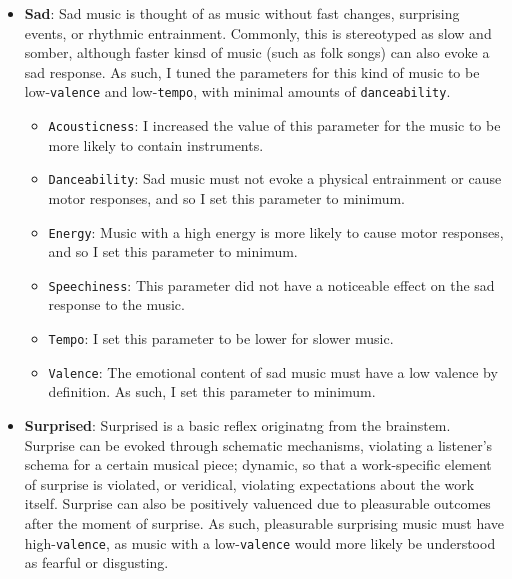 \documentclass{article}
\renewcommand{\_}[1]{\underline{ #1 }}
\theoremstyle{definition}
\begin{document}
\begin{itemize}
    \item \textbf{Sad}: Sad music is thought of as music without fast changes, surprising events, or rhythmic entrainment. Commonly, this is stereotyped as slow and somber, although faster kinsd of music (such as folk songs) can also evoke a sad response. As such, I tuned the parameters for this kind of music to be low-\texttt{valence} and low-\texttt{tempo}, with minimal amounts of \texttt{danceability}.

        \begin{itemize}
            \item \texttt{Acousticness}: I increased the value of this parameter for the music to be more likely to contain instruments.
            \item \texttt{Danceability}: Sad music must not evoke a physical entrainment or cause motor responses, and so I set this parameter to minimum.
            \item \texttt{Energy}: Music with a high energy is more likely to cause motor responses, and so I set this parameter to minimum.
            \item \texttt{Speechiness}: This parameter did not have a noticeable effect on the sad response to the music.
            \item \texttt{Tempo}: I set this parameter to be lower for slower music.
            \item \texttt{Valence}: The emotional content of sad music must have a low valence by definition. As such, I set this parameter to minimum.
        \end{itemize}

    \item \textbf{Surprised}: Surprised is a basic reflex originatng from the brainstem. Surprise can be evoked through schematic mechanisms, violating a listener's schema for a certain musical piece; dynamic, so that a work-specific element of surprise is violated, or veridical, violating expectations about the work itself. Surprise can also be positively valuenced due to pleasurable outcomes after the moment of surprise. As such, pleasurable surprising music must have high-\texttt{valence}, as music with a low-\texttt{valence} would more likely be understood as fearful or disgusting.


\end{itemize}
\end{document}
